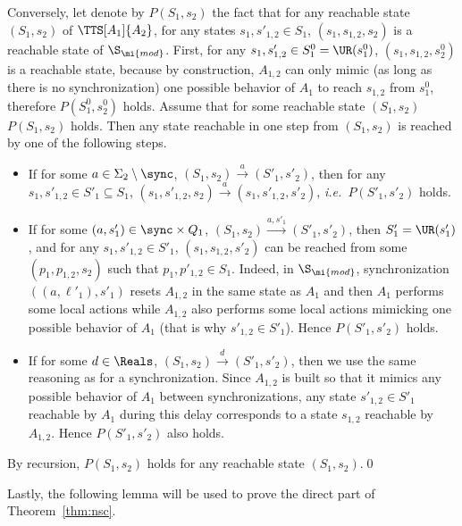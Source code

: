 \documentclass{LMCS}
\theoremstyle{plain}\newtheorem*{prop11}{Proposition~\ref{prop:states} bis}
\def\ie{{\em i.e.\ }}
\begin{document}
  Conversely, let denote by $P(S_1,s_2)$ the fact that for any reachable
  state $(S_1,s_2)$ of $\TTS[A_1]{A_2}$, for any states
  $s_1,s'_{1,2}\in S_1$, $(s_1,s_{1,2},s_2)$ is a reachable state of
  $\S_\mi{mod}$.
  First, for any $s_1,s'_{1,2}\in S_1^0=\UR(s_1^0)$, $(s_1,s_{1,2},s_2^0)$
  is a reachable state, because by construction, $A_{1,2}$ can only mimic
  (as long as there is no synchronization) one possible behavior of $A_1$
  to reach $s_{1,2}$ from $s_1^0$, therefore $P(S_1^0,s_2^0)$
  holds.
  Assume that for some reachable state $(S_1,s_2)$ $P(S_1,s_2)$ holds.
  Then any state reachable in one step from $(S_1,s_2)$ is reached by one of
  the following steps.
  \begin{itemize}
  \item If for some $a\in \Sigma_2\setminus\sync$,
    $(S_1,s_2)\xrightarrow{a}(S'_1,s'_2)$, then for any
    \mbox{$s_1,s'_{1,2}\in S'_1\subseteq S_1$},
    $(s_1,s'_{1,2},s_2)\xrightarrow{a}(s_1,s'_{1,2},s'_2)$,
    \ie $P(S'_1,s'_2)$ holds.
  \item If for some $(a,s'_1)\in \sync\times Q_1$,
    $(S_1,s_2)\xrightarrow{a,s'_1}(S'_1,s'_2)$, then $S'_1=\UR(s'_1)$, and
    for any \mbox{$s_1,s'_{1,2}\in S'_1$}, $(s_1,s_{1,2},s'_2)$ can be
    reached from some $(p_1,p_{1,2},s_2)$ such that \mbox{$p_1,p'_{1,2}\in S_1$}.
    Indeed, in $\S_\mi{mod}$, synchronization $((a,\ell'_1),s'_1)$ resets
    $A_{1,2}$ in the same state as $A_1$ and then
    $A_1$ performs some local actions while $A_{1,2}$ also performs some
    local actions mimicking one possible behavior of $A_1$ (that is why
    $s'_{1,2}\in S'_1$).
    Hence $P(S'_1,s'_2)$ holds.
  \item If for some $d\in \Reals$,
    $(S_1,s_2)\xrightarrow{d}(S'_1,s'_2)$, then we use the same reasoning as
    for a synchronization. Since $A_{1,2}$ is built
    so that it mimics any possible behavior of $A_1$ between synchronizations,
    any state $s'_{1,2}\in S'_1$ reachable by $A_1$ during this delay
    corresponds to a state $s_{1,2}$ reachable by $A_{1,2}$.
    Hence $P(S'_1,s'_2)$ also holds.
  \end{itemize}
  By recursion, $P(S_1,s_2)$ holds for any reachable state $(S_1,s_2)$.\qed


Lastly, the following lemma will be used to prove the direct part of
Theorem~\ref{thm:nsc}.
\end{document}
